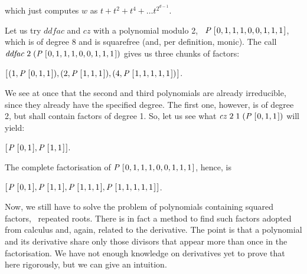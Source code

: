\documentclass[tikz]{scrreprt}
\newcommand{\Conid}[1]{\mathit{#1}}
\newcommand{\Varid}[1]{\mathit{#1}}
\begin{document}
which just computes $w$ as $t + t^2 + t^4 + \dots t^{2^{d-1}}$.

Let us try \ensuremath{\Varid{ddfac}} and \ensuremath{\Varid{cz}} with a polynomial modulo 2,
\eg\ \ensuremath{\Conid{P}\;[\mskip1.5mu \mathrm{0},\mathrm{1},\mathrm{1},\mathrm{1},\mathrm{0},\mathrm{0},\mathrm{1},\mathrm{1},\mathrm{1}\mskip1.5mu]}, which is of degree 8 and
is squarefree (and, per definition, monic).
The call \ensuremath{\Varid{ddfac}\;\mathrm{2}\;(\Conid{P}\;[\mskip1.5mu \mathrm{0},\mathrm{1},\mathrm{1},\mathrm{1},\mathrm{0},\mathrm{0},\mathrm{1},\mathrm{1},\mathrm{1}\mskip1.5mu])} gives
us three chunks of factors:

\ensuremath{[\mskip1.5mu (\mathrm{1},\Conid{P}\;[\mskip1.5mu \mathrm{0},\mathrm{1},\mathrm{1}\mskip1.5mu]),(\mathrm{2},\Conid{P}\;[\mskip1.5mu \mathrm{1},\mathrm{1},\mathrm{1}\mskip1.5mu]),(\mathrm{4},\Conid{P}\;[\mskip1.5mu \mathrm{1},\mathrm{1},\mathrm{1},\mathrm{1},\mathrm{1}\mskip1.5mu])\mskip1.5mu]}.

We see at once that the second and third polynomials
are already irreducible, since they already have 
the specified degree. The first one, however, is
of degree 2, but shall contain factors of degree 1.
So, let us see what \ensuremath{\Varid{cz}\;\mathrm{2}\;\mathrm{1}\;(\Conid{P}\;[\mskip1.5mu \mathrm{0},\mathrm{1},\mathrm{1}\mskip1.5mu])} will yield:

\ensuremath{[\mskip1.5mu \Conid{P}\;[\mskip1.5mu \mathrm{0},\mathrm{1}\mskip1.5mu],\Conid{P}\;[\mskip1.5mu \mathrm{1},\mathrm{1}\mskip1.5mu]\mskip1.5mu]}.

The complete factorisation of \ensuremath{\Conid{P}\;[\mskip1.5mu \mathrm{0},\mathrm{1},\mathrm{1},\mathrm{1},\mathrm{0},\mathrm{0},\mathrm{1},\mathrm{1},\mathrm{1}\mskip1.5mu]},
hence, is

\ensuremath{[\mskip1.5mu \Conid{P}\;[\mskip1.5mu \mathrm{0},\mathrm{1}\mskip1.5mu],\Conid{P}\;[\mskip1.5mu \mathrm{1},\mathrm{1}\mskip1.5mu],\Conid{P}\;[\mskip1.5mu \mathrm{1},\mathrm{1},\mathrm{1}\mskip1.5mu],\Conid{P}\;[\mskip1.5mu \mathrm{1},\mathrm{1},\mathrm{1},\mathrm{1},\mathrm{1}\mskip1.5mu]\mskip1.5mu]}.

Now, we still have to solve the problem of polynomials
containing squared factors, \ie\ repeated roots.
There is in fact a method to find such factors
adopted from calculus and, again, related to the
derivative. The point is that a polynomial and
its derivative share only those divisors that
appear more than once in the factorisation.
We have not enough knowledge on derivatives yet to
prove that here rigorously, but we can give an
intuition.
\end{document}
